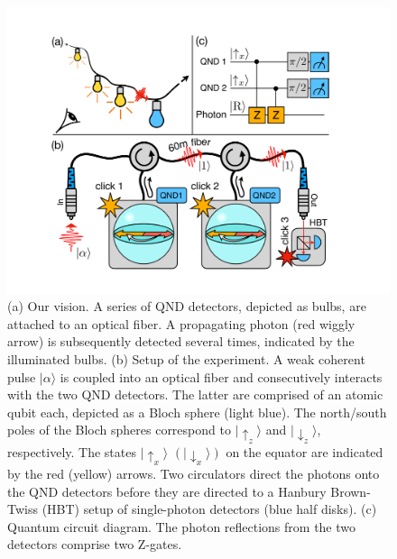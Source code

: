 \documentclass[prl,amsmath,amssymb,bibnotes,aps,longbibliography,12pt]{revtex4-1}
\newcommand{\ket}[1]{|{#1}\rangle}
\begin{document}
\begin{figure}[b]
\centering
\includegraphics[width=\columnwidth]{Fig1.pdf}
\caption{\label{fig:setup} (a) Our vision. A series of QND detectors, depicted as bulbs, are attached to an optical fiber. A propagating photon (red wiggly arrow) is subsequently detected several times, indicated by the illuminated bulbs. (b) Setup of the experiment. A weak coherent pulse $\ket{\alpha}$ is coupled into an optical fiber and consecutively interacts with the two QND detectors. The latter are comprised of an atomic qubit each, depicted as a Bloch sphere (light blue). The north/south poles of the Bloch spheres correspond to $\ket{\uparrow_z}$ and $\ket{\downarrow_z}$, respectively. The states $\ket{\uparrow_x}$ $(\ket{\downarrow_x})$ on the equator are indicated by the red (yellow) arrows. Two circulators direct the photons onto the QND detectors before they are directed to a Hanbury Brown-Twiss (HBT) setup of single-photon detectors (blue half disks). (c) Quantum circuit diagram. The photon reflections from the two detectors comprise two Z-gates.}
\end{figure}
\end{document}
